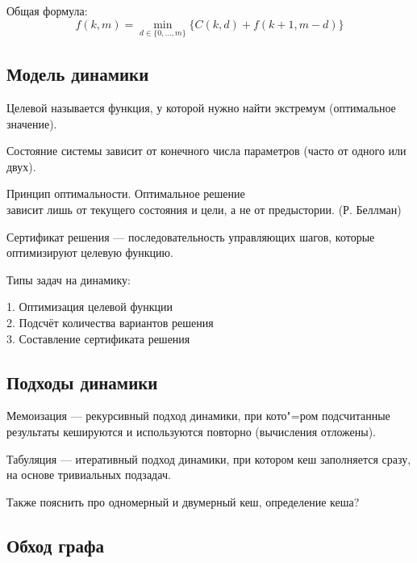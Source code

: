 Общая формула:
$$f(k,m)=\min_{d\in\{0,\dots,m\}}\{C(k,d)+f(k+1,m-d)\}$$

\newpage
\subsection{Модель динамики}

{\bold Целевой} называется функция, у которой нужно найти {\ital экстремум {\color{desc}(оптимальное значение)}}.

{\bold Состояние} системы зависит от конечного числа {\ital параметров {\color{desc} (часто от одного или двух)}}.
\begin{theorem}
{\bold Принцип оптимальности}. Оптимальное решение\\ зависит лишь от текущего состояния и цели, а не от предыстории. {\ital\color{desc}(Р. Беллман)}
\end{theorem}
{\bold Сертификат} {\ital решения} --- последовательность управляющих шагов, которые оптимизируют целевую функцию.

{\ital Типы} задач на динамику:

1. Оптимизация целевой функции\\
2. Подсчёт количества вариантов решения\\
3. Составление сертификата решения

\subsection{Подходы динамики}

{\bold Мемоизация} --- {\ital рекурсивный} подход динамики, при кото"=ром подсчитанные результаты {\ital кешируются} и используются повторно {\ital\color{desc}(вычисления отложены)}.

{\bold Табуляция} --- {\ital итеративный} подход динамики, при котором кеш заполняется сразу, на основе тривиальных подзадач.

Также пояснить про одномерный и двумерный кеш, определение кеша?

\subsection{Обход графа}

